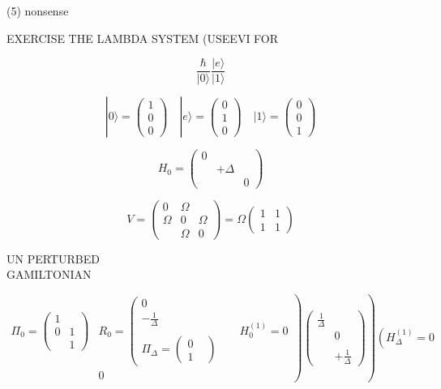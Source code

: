 \documentclass[10pt]{article}
\begin{document}
(5) nonsense

EXERCISE THE LAMBDA SYSTEM (USEEVI FOR

$$
\frac{\hbar}{|0\rangle} \frac{|e\rangle}{|1\rangle}
$$

$$
|0\rangle=\left(\begin{array}{l}
1 \\
0 \\
0
\end{array}\right) \quad|e\rangle=\left(\begin{array}{l}
0 \\
1 \\
0
\end{array}\right) \quad|1\rangle=\left(\begin{array}{l}
0 \\
0 \\
1
\end{array}\right)
$$

$$
H_{0}=\left(\begin{array}{ccc}
0 & & \\
& +\Delta & \\
& & 0
\end{array}\right)
$$

$$
V=\left(\begin{array}{ccc}
0 & \Omega & \\
\Omega & 0 & \Omega \\
& \Omega & 0
\end{array}\right)=\Omega\left(\begin{array}{ll}
1 & 1 \\
1 & 1
\end{array}\right)
$$

UN PERTURBED\\
GAMILTONIAN

$$
\left.\left.\begin{array}{lll}
\Pi_{0}=\left(\begin{array}{ll}
1 & \\
0 & 1 \\
& 1
\end{array}\right) & R_{0}=\left(\begin{array}{cc}
0 & \\
-\frac{1}{\Delta} & \\
& \\
\Pi_{\Delta}=\left(\begin{array}{ll}
0 & \\
1
\end{array}\right)
\end{array}\right. & H_{0}^{(1)}=0 \\
& 0
\end{array}\right)\left(\begin{array}{cc}
\frac{1}{\Delta} & \\
& 0 \\
& \\
& +\frac{1}{\Delta}
\end{array}\right)\right)\left(H_{\Delta}^{(1)}=0\right.
$$
\end{document}
